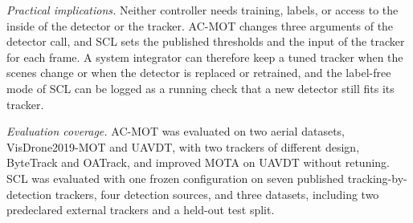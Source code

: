\emph{Practical implications.} Neither controller needs training, labels, or access to the inside of the detector or the tracker. AC-MOT changes three arguments of the detector call, and SCL sets the published thresholds and the input of the tracker for each frame. A system integrator can therefore keep a tuned tracker when the scenes change or when the detector is replaced or retrained, and the label-free mode of SCL can be logged as a running check that a new detector still fits its tracker.

\emph{Evaluation coverage.} AC-MOT was evaluated on two aerial datasets, VisDrone2019-MOT and UAVDT, with two trackers of different design, ByteTrack and OATrack, and improved MOTA on UAVDT without retuning. SCL was evaluated with one frozen configuration on seven published tracking-by-detection trackers, four detection sources, and three datasets, including two predeclared external trackers and a held-out test split.

